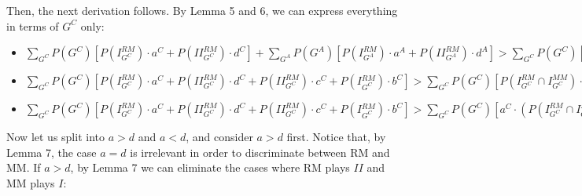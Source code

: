 \documentclass[fleqn,reqno,11pt]{article}
\begin{document}
\noindent Then, the next derivation follows. By Lemma 5 and 6, we can express
everything in terms of $G^{C}$ only: 
\begin{itemize}
\item $\sum_{G^{C}}P(G^{C})[P(I_{G^{C}}^{RM})\cdot a^{C}+P(II_{G^{C}}^{RM})\cdot d^{C}]+\sum_{G^{A}}P(G^{A})[P(I_{G^{A}}^{RM})\cdot a^{A}+P(II_{G^{A}}^{RM})\cdot d^{A}]>\sum_{G^{C}}P(G^{C})[P(I_{G^{C}}^{RM}\cap I_{G^{C}}^{MM})\cdot a^{C}+P(II_{G^{C}}^{RM}\cap II_{G^{C}}^{MM})\cdot d^{C}+P(I_{G^{C}}^{RM}\cap II_{G^{C}}^{MM})\cdot c^{C}+P(II_{G^{C}}^{RM}\cap I_{G^{C}}^{MM})\cdot b^{C}]+\sum_{G^{A}}P(G^{A})[P(I_{G^{A}}^{RM}\cap I_{G^{A}}^{MM})\cdot a^{A}+P(II_{G^{A}}^{RM}\cap II_{G^{A}}^{MM})\cdot d^{A}+P(I_{G^{A}}^{RM}\cap II_{G^{A}}^{MM})\cdot c^{A}+P(II_{G^{A}}^{RM}\cap I_{G^{A}}^{MM})\cdot b^{A}]$
\item $\sum_{G^{C}}P(G^{C})[P(I_{G^{C}}^{RM})\cdot a^{C}+P(II_{G^{C}}^{RM})\cdot d^{C}+P(II_{G^{C}}^{RM})\cdot c^{C}+P(I{}_{G^{C}}^{RM})\cdot b^{C}]>\sum_{G^{C}}P(G^{C})[P(I_{G^{C}}^{RM}\cap I_{G^{C}}^{MM})\cdot a^{C}+P(II_{G^{C}}^{RM}\cap II_{G^{C}}^{MM})\cdot d^{C}+P(I_{G^{C}}^{RM}\cap II_{G^{C}}^{MM})\cdot c^{C}+P(II_{G^{C}}^{RM}\cap I_{G^{C}}^{MM})\cdot b^{C}+P(II_{G^{C}}^{RM}\cap II_{G^{C}}^{MM})\cdot c^{C}+P(I_{G^{C}}^{RM}\cap I_{G^{C}}^{MM})\cdot b^{C}+P(II_{G^{C}}^{RM}\cap I_{G^{C}}^{MM})\cdot a^{C}+P(I_{G^{C}}^{RM}\cap II_{G^{C}}^{MM})\cdot d^{C}]$
\item $\sum_{G^{C}}P(G^{C})[P(I_{G^{C}}^{RM})\cdot a^{C}+P(II_{G^{C}}^{RM})\cdot d^{C}+P(II_{G^{C}}^{RM})\cdot c^{C}+P(I{}_{G^{C}}^{RM})\cdot b^{C}]>\sum_{G^{C}}P(G^{C})[a^{C}\cdot(P(I_{G^{C}}^{RM}\cap I_{G^{C}}^{MM})+P(II_{G^{C}}^{RM}\cap I_{G^{C}}^{MM}))+b^{C}\cdot(P(II_{G^{C}}^{RM}\cap I_{G^{C}}^{MM})+P(I_{G^{C}}^{RM}\cap I_{G^{C}}^{MM}))+c^{C}\cdot(P(I_{G^{C}}^{RM}\cap II_{G^{C}}^{MM})+P(II_{G^{C}}^{RM}\cap II_{G^{C}}^{MM}))+d^{C}\cdot(P(II_{G^{C}}^{RM}\cap II_{G^{C}}^{MM})+P(I_{G^{C}}^{RM}\cap II_{G^{C}}^{MM}))]$
\end{itemize}
Now let us split into $a>d$ and $a<d$, and consider $a>d$ first.
Notice that, by Lemma 7, the case $a=d$ is irrelevant in order to
discriminate between RM and MM. If $a>d$, by Lemma 7 we can eliminate
the cases where RM plays $II$ and MM plays $I$:
\end{document}
